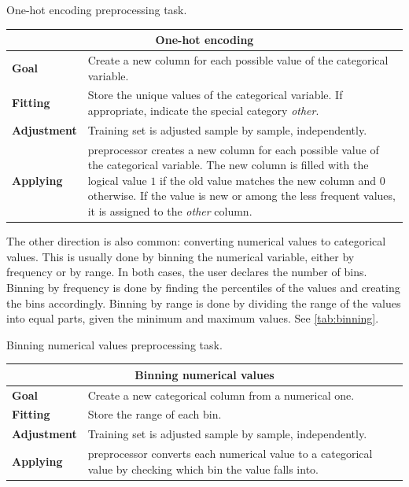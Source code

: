 \begin{tablebox}[label=tab:one-hot]{One-hot encoding preprocessing task.}
  \centering
  \begin{tabular}{lp{6cm}}
    \toprule
    \multicolumn{2}{c}{\textbf{One-hot encoding}} \\
    \midrule
    \textbf{Goal} &
      Create a new column for each possible value of the categorical variable. \\
    \textbf{Fitting} &
      Store the unique values of the categorical variable.  If appropriate, indicate
      the special category \emph{other}.  \\
    \textbf{Adjustment} &
      Training set is adjusted sample by sample, independently. \\
    \textbf{Applying} &
      \Gls{preprocessor} creates a new column for each possible value of the categorical
      variable.  The new column is filled with the logical value $1$ if the old value
      matches the new column and $0$ otherwise.  If the value is new or among the less
      frequent values, it is assigned to the \emph{other} column.  \\
    \bottomrule
  \end{tabular}
\end{tablebox}

The other direction is also common: converting numerical values to categorical values.
This is usually done by binning the numerical variable, either by frequency or by range.
In both cases, the user declares the number of bins.  Binning by frequency is done by
finding the percentiles of the values and creating the bins accordingly.  Binning by
range is done by dividing the range of the values into equal parts, given the minimum and
maximum values.  See \cref{tab:binning}.

\begin{tablebox}[label=tab:binning]{Binning numerical values preprocessing task.}
  \centering
  \begin{tabular}{lp{6cm}}
    \toprule
    \multicolumn{2}{c}{\textbf{Binning numerical values}} \\
    \midrule
    \textbf{Goal} &
      Create a new categorical column from a numerical one.  \\
    \textbf{Fitting} &
      Store the range of each bin. \\
    \textbf{Adjustment} &
      Training set is adjusted sample by sample, independently. \\
    \textbf{Applying} &
      \Gls{preprocessor} converts each numerical value to a categorical value by checking
      which bin the value falls into. \\
    \bottomrule
  \end{tabular}
\end{tablebox}

